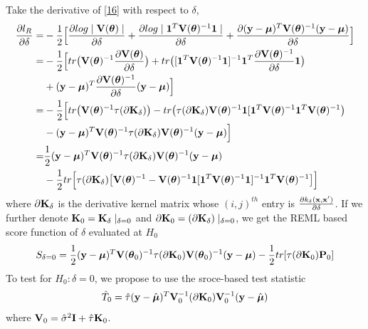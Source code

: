 \documentclass[11pt]{article}
\begin{document}
Take the derivative of \eqref{16} with respect to $\delta$,
\begin{align*}
\frac{\partial l_R}{\partial \delta}=&-\frac{1}{2}\Big[\frac{\partial log\mid {\bf V}(\boldsymbol{\theta}) \mid}{\partial \delta}+\frac{\partial log \mid \mathbf{1}^T{\bf V}(\boldsymbol{\theta})^{-1}\mathbf{1} \mid}{\partial \delta}+ \frac{\partial ({\bf y}-\boldsymbol{\mu})^T{\bf V}(\boldsymbol{\theta})^{-1}({\bf y}-\boldsymbol{\mu})}{\partial \delta}\Big]\\
=&-\frac{1}{2}\Big[tr\big({\bf V}(\boldsymbol{\theta})^{-1}\frac{\partial {\bf V}(\boldsymbol{\theta})}{\partial \delta}\big)+tr\big([\mathbf{1}^T{\bf V}(\boldsymbol{\theta})^{-1}\mathbf{1}]^{-1}\mathbf{1}^T\frac{\partial {\bf V}(\boldsymbol{\theta})^{-1}}{\partial \delta}\mathbf{1}\big)\\
&+({\bf y}-\boldsymbol{\mu})^T\frac{\partial {\bf V}(\boldsymbol{\theta})^{-1}}{\partial \delta}({\bf y}-\boldsymbol{\mu}) \Big]\\
=&-\frac{1}{2}\Big[tr\big({\bf V}(\boldsymbol{\theta})^{-1}\tau (\partial {\bf K}_\delta)\big)-tr\big(\tau (\partial {\bf K}_\delta){\bf V}(\boldsymbol{\theta})^{-1}\mathbf{1}[\mathbf{1}^T{\bf V}(\boldsymbol{\theta})^{-1}\mathbf{1}^T{\bf V}(\boldsymbol{\theta})^{-1}\big)\\
&-({\bf y}-\boldsymbol{\mu})^T{\bf V}(\boldsymbol{\theta})^{-1}\tau (\partial {\bf K}_\delta){\bf V}(\boldsymbol{\theta})^{-1}({\bf y}-\boldsymbol{\mu}) \Big]\\
=&\frac{1}{2}({\bf y}-\boldsymbol{\mu})^T{\bf V}(\boldsymbol{\theta})^{-1}\tau (\partial {\bf K}_\delta){\bf V}(\boldsymbol{\theta})^{-1}({\bf y}-\boldsymbol{\mu})\\
&-\frac{1}{2}tr\Big[\tau (\partial {\bf K}_\delta)\big[{\bf V}(\boldsymbol{\theta})^{-1}-{\bf V}(\boldsymbol{\theta})^{-1}\mathbf{1}[\mathbf{1}^T{\bf V}(\boldsymbol{\theta})^{-1}\mathbf{1} ]^{-1}\mathbf{1}^T{\bf V}(\boldsymbol{\theta})^{-1}\big]\Big]
\end{align*}
where $\partial {\bf K}_\delta$ is the derivative kernel matrix whose $(i,j)^{th}$ entry is $\frac{\partial k_\delta({\bf x}, {\bf x}')}{\partial \delta}$. If we further denote ${\bf K}_0={\bf K}_\delta \mid_{\delta=0}$ and $\partial {\bf K}_0=(\partial {\bf K}_\delta)\mid_{\delta=0}$, we get the REML based score function of $\delta$ evaluated at $H_0$
\begin{align*}
S_{\delta=0}=\frac{1}{2}({\bf y}-\boldsymbol{\mu})^T{\bf V}(\boldsymbol{\theta}_0)^{-1}\tau (\partial {\bf K}_0){\bf V}(\boldsymbol{\theta}_0)^{-1}({\bf y}-\boldsymbol{\mu})-\frac{1}{2}tr[\tau (\partial {\bf K}_0){\bf P}_0]
\end{align*}
To test for $H_0: \delta=0$, we propose to use the sroce-based test statistic
\begin{align*}
\hat{T}_0=\hat{\tau}({\bf y}-\hat{\boldsymbol{\mu}})^T{\bf V}_0^{-1} (\partial {\bf K}_0){\bf V}_0^{-1}({\bf y}-\hat{\boldsymbol{\mu}})
\end{align*}
where ${\bf V}_0=\hat{\sigma}^2{\bf I}+\hat{\tau}{\bf K}_0$.


\clearpage



\end{document}
